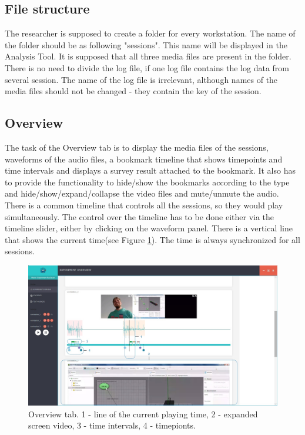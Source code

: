 \subsection{File structure}\label{subsec:fileStructure}
The researcher is supposed to create a folder for every workstation. The name of the folder should be as following "sessions". This name will be displayed in the Analysis Tool. It is supposed that all three media files are present in the folder. There is no need to divide the log file, if one log file contains the log data from several session. The name of the log file is irrelevant, although names of the media files should not be changed - they contain the key of the session.\\

\subsection{Overview}\label{subsec:overview}

The task of the Overview tab is to display the media files of the sessions, waveforms of the audio files, a bookmark timeline that shows timepoints and time intervals and displays a survey result attached to the bookmark. It also has to provide the functionality to hide/show the bookmarks according to the type and hide/show/expand/collapse the video files and mute/unmute the audio. There is a common timeline that controls all the sessions, so they would play simultaneously. The control over the timeline has to be done either via the timeline slider, either by clicking on the waveform panel. There is a vertical line that shows the current time(see Figure \ref{fig:overview_3}). The time is always synchronized for all sessions.\\

\begin{figure}[htb]
 \centering
\includegraphics[width=\textwidth]{figures/overview_3.jpg}
\caption{Overview tab. 1 - line of the current playing time, 2 - expanded screen video, 3 - time intervals, 4 - timepionts.}
\label{fig:overview_3}
\end{figure}

